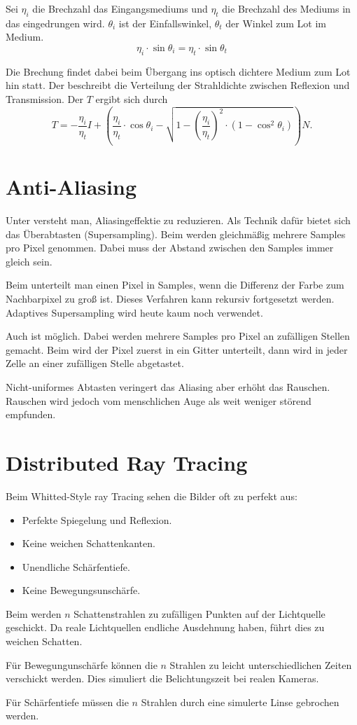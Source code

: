 \begin{Theorem}
	Sei $\eta_i$ die Brechzahl das Eingangsmediums und $\eta_t$ die Brechzahl des Mediums in das eingedrungen wird.
	$\theta_i$ ist der Einfallswinkel, $\theta_t$ der Winkel zum Lot im Medium.
	\[
		\eta_i \cdot \sin \theta_i = \eta_t \cdot \sin \theta_t
	\]
\end{Theorem}

Die Brechung findet dabei beim Übergang ins optisch dichtere Medium zum Lot hin statt.
Der  beschreibt die Verteilung der Strahldichte zwischen Reflexion und Transmission.
Der  $T$ ergibt sich durch
\[
	T = - \frac{\eta_i}{\eta_t} I +
	\left(
		\frac{\eta_i}{\eta_t} \cdot \cos \theta_i -
		\sqrt{1 - \left(\frac{\eta_i}{\eta_t}\right)^2 \cdot \left(1 - \cos^2 \theta_i\right)}
	\right)N \text{.}
\]

\section{Anti-Aliasing}
Unter  versteht man, Aliasingeffektie zu reduzieren.
Als Technik dafür bietet sich das Überabtasten (Supersampling).
Beim  werden gleichmäßig mehrere Samples pro Pixel genommen.
Dabei muss der Abstand zwischen den Samples immer gleich sein.

Beim  unterteilt man einen Pixel in Samples, wenn die Differenz der Farbe zum Nachbarpixel zu groß ist.
Dieses Verfahren kann rekursiv fortgesetzt werden.
Adaptives Supersampling wird heute kaum noch verwendet.

Auch  ist möglich.
Dabei werden mehrere Samples pro Pixel an zufälligen Stellen gemacht.
Beim  wird der Pixel zuerst in ein Gitter unterteilt, dann wird in jeder Zelle an einer zufälligen Stelle abgetastet.

Nicht-uniformes Abtasten veringert das Aliasing aber erhöht das Rauschen.
Rauschen wird jedoch vom menschlichen Auge als weit weniger störend empfunden.

\section{Distributed Ray Tracing}
Beim Whitted-Style ray Tracing sehen die Bilder oft zu perfekt aus:
\begin{itemize}
	\item Perfekte Spiegelung und Reflexion.
	\item Keine weichen Schattenkanten.
	\item Unendliche Schärfentiefe.
	\item Keine Bewegungsunschärfe.
\end{itemize}
Beim  werden $n$ Schattenstrahlen zu zufälligen Punkten auf der Lichtquelle geschickt.
Da reale Lichtquellen endliche Ausdehnung haben, führt dies zu weichen Schatten.

Für Bewegungunschärfe können die $n$ Strahlen zu leicht unterschiedlichen Zeiten verschickt werden.
Dies simuliert die Belichtungszeit bei realen Kameras.

Für Schärfentiefe müssen die $n$ Strahlen durch eine simulerte Linse gebrochen werden.
